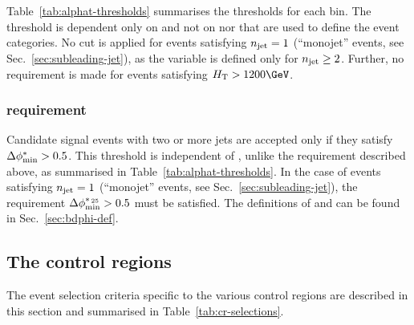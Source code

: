 Table~\ref{tab:alphat-thresholds} summarises the \alphat thresholds
for each \HT bin. The \alphat threshold is dependent only on \HT and
not on \njet nor \nb that are used to define the event categories. No
\alphat cut is applied for events satisfying $n_{\text{jet}} = 1$ (``monojet''
events, see Sec.~\ref{sec:subleading-jet}), as the variable is defined
only for $n_{\text{jet}} \geq 2$. Further, no requirement is made for events
satisfying $\scalht > 1200\GeV$.

\subsubsection{\texorpdfstring{\bdphi}{biased dPhi} requirement} 
\label{sec:bdphi-selection}

Candidate signal events with two or more jets are accepted only if
they satisfy $\mbox{$\Delta\phi^{*}_{\rm min}$} > 0.5$. This threshold is independent of \scalht,
unlike the \alphat requirement described above, as summarised in
Table~\ref{tab:alphat-thresholds}. In the case of events satisfying
$n_{\text{jet}} = 1$ (``monojet'' events, see Sec.~\ref{sec:subleading-jet}),
the requirement $\mbox{$\Delta\phi^{*_{\, 25}}_{\rm min}$} > 0.5$ must be satisfied. The definitions
of \bdphi and \bdphimod can be found in Sec.~\ref{sec:bdphi-def}. 

\subsection{The control regions}
\label{sec:control-region-selection}

The event selection criteria specific to the various control regions
are described in this section and summarised in
Table~\ref{tab:cr-selections}.

